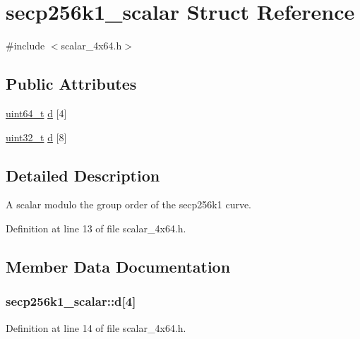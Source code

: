 \hypertarget{structsecp256k1__scalar}{}\section{secp256k1\+\_\+scalar Struct Reference}
\label{structsecp256k1__scalar}


{\ttfamily \#include $<$scalar\+\_\+4x64.\+h$>$}

\subsection*{Public Attributes}
\begin{DoxyCompactItemize}
\item 
\hyperlink{stdint_8h_aaa5d1cd013383c889537491c3cfd9aad}{uint64\+\_\+t} \hyperlink{structsecp256k1__scalar_a4aba1d263d205acdd537ed9a995393cd}{d} \mbox{[}4\mbox{]}
\item 
\hyperlink{stdint_8h_a435d1572bf3f880d55459d9805097f62}{uint32\+\_\+t} \hyperlink{structsecp256k1__scalar_a59f64975b56084412306eb10aaa6d54e}{d} \mbox{[}8\mbox{]}
\end{DoxyCompactItemize}


\subsection{Detailed Description}
A scalar modulo the group order of the secp256k1 curve. 

Definition at line 13 of file scalar\+\_\+4x64.\+h.



\subsection{Member Data Documentation}
\hypertarget{structsecp256k1__scalar_a4aba1d263d205acdd537ed9a995393cd}{}
\subsubsection[{d}]{ secp256k1\+\_\+scalar\+::d\mbox{[}4\mbox{]}}\label{structsecp256k1__scalar_a4aba1d263d205acdd537ed9a995393cd}


Definition at line 14 of file scalar\+\_\+4x64.\+h.

\hypertarget{structsecp256k1__scalar_a59f64975b56084412306eb10aaa6d54e}{}
